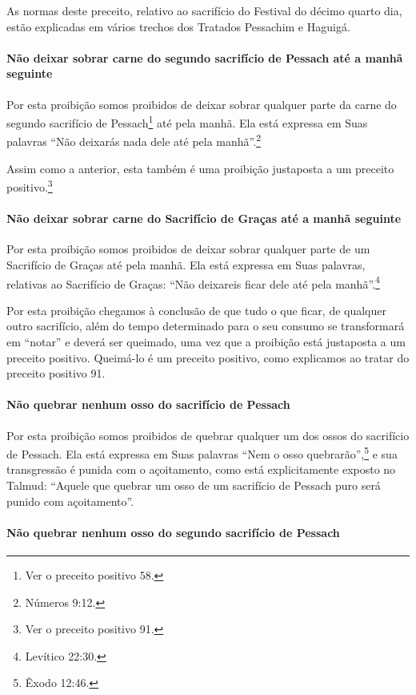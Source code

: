 As normas deste preceito, relativo ao sacrifício do Festival do décimo
quarto dia, estão explicadas em vários trechos dos Tratados Pessachim e
Haguigá.

\paragraph{Não deixar sobrar carne do segundo sacrifício de Pessach até a manhã seguinte}

Por esta proibição somos proibidos de deixar sobrar qualquer parte da
carne do segundo sacrifício de Pessach\footnote{Ver o preceito positivo 58.} até pela
manhã. Ela está expressa em Suas palavras ``Não deixarás nada dele até
pela manhã''.\footnote{Números 9:12.}

Assim como a anterior, esta também é uma proibição justaposta a um
preceito positivo.\footnote{Ver o preceito positivo 91.}

\paragraph{Não deixar sobrar carne do Sacrifício de Graças até a manhã seguinte}

Por esta proibição somos proibidos de deixar sobrar qualquer parte de um
Sacrifício de Graças até pela manhã. Ela está expressa em Suas palavras,
relativas ao Sacrifício de Graças: ``Não deixareis ficar dele até pela
manhã''.\footnote{Levítico 22:30.}

Por esta proibição chegamos à conclusão de que tudo o que ficar, de
qualquer outro sacrifício, além do tempo determinado para o seu consumo
se transformará em ``notar'' e deverá ser queimado, uma vez que a
proibição está justaposta a um preceito positivo. Queimá-lo é um
preceito positivo, como explicamos ao tratar do preceito positivo 91.

\paragraph{Não quebrar nenhum osso do sacrifício de Pessach}

Por esta proibição somos proibidos de quebrar qualquer um dos ossos do
sacrifício de Pessach. Ela está expressa em Suas palavras ``Nem o
osso quebrarão'',\footnote{Êxodo 12:46.} e sua transgressão é punida com o
açoitamento, como está explicitamente exposto no Talmud: ``Aquele que
quebrar um osso de um sacrifício de Pessach puro será punido com
açoitamento''.


\paragraph{Não quebrar nenhum osso do segundo sacrifício de Pessach}

